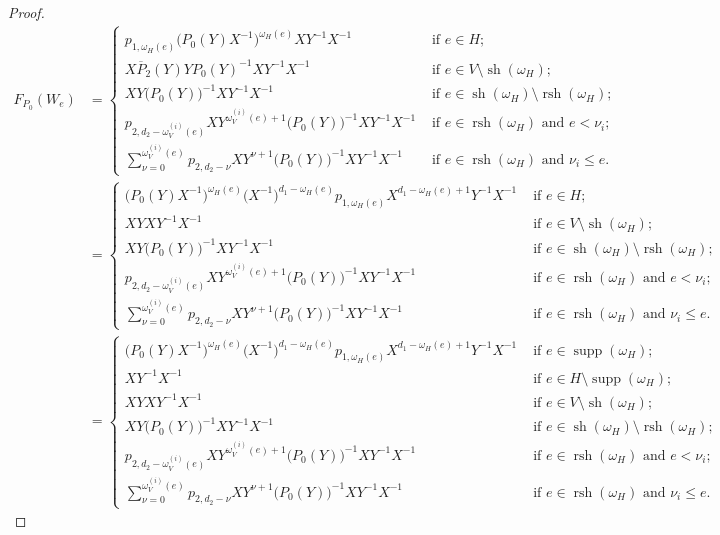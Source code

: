 \documentclass{amsart}
\newcommand{\supp}{\operatorname{supp}}
\newcommand{\rsh}{\operatorname{rsh}}
\newcommand{\sh}{\operatorname{sh}}
\begin{document}
\begin{proof}
 \begin{align*}
  F_{P_0}(W_e)
  &=\begin{cases}p_{1,\omega_H(e)}\big(P_0(Y)X^{-1}\big)^{\omega_H(e)}XY^{-1}X^{-1} & \text{ if $e\in H$;}\\ X\overline{P}_2(Y)YP_0(Y)^{-1}XY^{-1}X^{-1} & \text{ if $e\in V\setminus\sh(\omega_H);$}\\ XY\big(P_0(Y)\big)^{-1}XY^{-1}X^{-1} & \text{ if $e\in\sh(\omega_H)\setminus\rsh(\omega_H)$;}\\ p_{2,d_2-\omega_V^{(i)}(e)}XY^{\omega_V^{(i)}(e)+1}\big(P_0(Y)\big)^{-1}XY^{-1}X^{-1} & \text{ if $e\in\rsh(\omega_H)$ and $e<\nu_i$;}\\ \sum\limits_{\nu=0}^{\omega_V^{(i)}(e)}p_{2,d_2-\nu}XY^{\nu+1}\big(P_0(Y)\big)^{-1}XY^{-1}X^{-1} & \text{ if $e\in\rsh(\omega_H)$ and $\nu_i\le e$.}\end{cases}\\
  &=\begin{cases}\big(P_0(Y)X^{-1}\big)^{\omega_H(e)}\big(X^{-1}\big)^{d_1-\omega_H(e)}p_{1,\omega_H(e)}X^{d_1-\omega_H(e)+1}Y^{-1}X^{-1} & \text{ if $e\in H$;}\\ XYXY^{-1}X^{-1} & \text{ if $e\in V\setminus\sh(\omega_H);$}\\ XY\big(P_0(Y)\big)^{-1}XY^{-1}X^{-1} & \text{ if $e\in\sh(\omega_H)\setminus\rsh(\omega_H)$;}\\ p_{2,d_2-\omega_V^{(i)}(e)}XY^{\omega_V^{(i)}(e)+1}\big(P_0(Y)\big)^{-1}XY^{-1}X^{-1} & \text{ if $e\in\rsh(\omega_H)$ and $e<\nu_i$;}\\ \sum\limits_{\nu=0}^{\omega_V^{(i)}(e)}p_{2,d_2-\nu}XY^{\nu+1}\big(P_0(Y)\big)^{-1}XY^{-1}X^{-1} & \text{ if $e\in\rsh(\omega_H)$ and $\nu_i\le e$.}\end{cases}\\
  &=\begin{cases}\big(P_0(Y)X^{-1}\big)^{\omega_H(e)}\big(X^{-1}\big)^{d_1-\omega_H(e)}p_{1,\omega_H(e)}X^{d_1-\omega_H(e)+1}Y^{-1}X^{-1} & \text{ if $e\in \supp(\omega_H)$;}\\XY^{-1}X^{-1} & \text{ if $e\in H\setminus\supp(\omega_H)$;}\\ XYXY^{-1}X^{-1} & \text{ if $e\in V\setminus\sh(\omega_H);$}\\ XY\big(P_0(Y)\big)^{-1}XY^{-1}X^{-1} & \text{ if $e\in\sh(\omega_H)\setminus\rsh(\omega_H)$;}\\ p_{2,d_2-\omega_V^{(i)}(e)}XY^{\omega_V^{(i)}(e)+1}\big(P_0(Y)\big)^{-1}XY^{-1}X^{-1} & \text{ if $e\in\rsh(\omega_H)$ and $e<\nu_i$;}\\ \sum\limits_{\nu=0}^{\omega_V^{(i)}(e)}p_{2,d_2-\nu}XY^{\nu+1}\big(P_0(Y)\big)^{-1}XY^{-1}X^{-1} & \text{ if $e\in\rsh(\omega_H)$ and $\nu_i\le e$.}\end{cases}
 \end{align*}


\end{proof}
\end{document}
